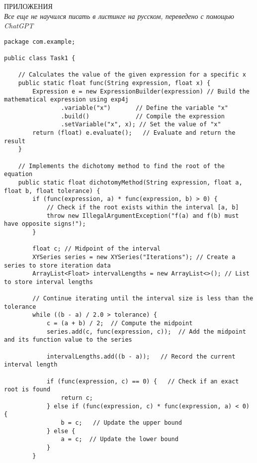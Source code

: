 \begin{center}
    ПРИЛОЖЕНИЯ\\
    \textit{Все еще не научился писать в листинге на русском, переведено с помощью ChatGPT}
\end{center}

\begin{lstlisting}[style=JavaStyle, caption={Java Code for Task1}]
package com.example;

public class Task1 {

    // Calculates the value of the given expression for a specific x
    public static float func(String expression, float x) {
        Expression e = new ExpressionBuilder(expression) // Build the mathematical expression using exp4j
                .variable("x")       // Define the variable "x"
                .build()             // Compile the expression
                .setVariable("x", x); // Set the value of "x"
        return (float) e.evaluate();   // Evaluate and return the result
    }

    // Implements the dichotomy method to find the root of the equation
    public static float dichotomyMethod(String expression, float a, float b, float tolerance) {
        if (func(expression, a) * func(expression, b) > 0) {
            // Check if the root exists within the interval [a, b]
            throw new IllegalArgumentException("f(a) and f(b) must have opposite signs!");
        }

        float c; // Midpoint of the interval
        XYSeries series = new XYSeries("Iterations"); // Create a series to store iteration data
        ArrayList<Float> intervalLengths = new ArrayList<>(); // List to store interval lengths

        // Continue iterating until the interval size is less than the tolerance
        while ((b - a) / 2.0 > tolerance) {
            c = (a + b) / 2;  // Compute the midpoint
            series.add(c, func(expression, c));  // Add the midpoint and its function value to the series

            intervalLengths.add((b - a));   // Record the current interval length

            if (func(expression, c) == 0) {   // Check if an exact root is found
                return c;
            } else if (func(expression, c) * func(expression, a) < 0) {
                b = c;   // Update the upper bound
            } else {
                a = c;  // Update the lower bound
            }
        }


\end{lstlisting}
